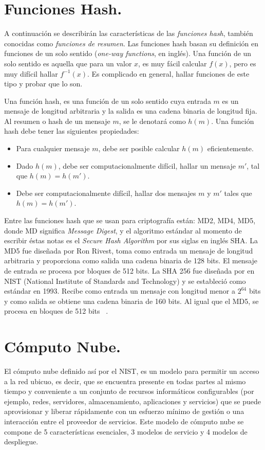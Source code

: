 \section{Funciones Hash. }
A continuación se describirán las características de las {\it funciones hash}, también conocidas como {\it funciones de resumen}. Las funciones hash basan su definición en funciones de un solo sentido  ({\it one-way functions}, en inglés). Una función de un solo sentido es aquella que para un valor $x$, es  muy fácil calcular $f(x)$, pero es muy difícil hallar $f^{-1}(x)$. Es complicado en general, hallar funciones de este tipo y probar que lo son.
\begin{definition}
Una función hash, es una función de un solo sentido cuya entrada $m$  es un mensaje de longitud arbitraria y la salida es una cadena binaria de longitud fija. Al resumen o hash de un mensaje $m$, se le denotará como $h(m)$. Una función hash debe
tener las siguientes propiedades:
\begin{itemize}
	\item Para cualquier mensaje $m$, debe ser posible calcular $h(m)$ eficientemente. 
	\item Dado $h(m)$, debe ser computacionalmente difícil, hallar un mensaje $m'$, tal que $h(m)=h(m')$.
	\item Debe ser computacionalmente difícil, hallar dos mensajes $m$ y $m'$ tales que $h(m)=h(m')$.
\end{itemize}
\end{definition}
 
Entre las funciones hash que se usan para criptograf\'ia est\'an: MD2, MD4, MD5, donde MD significa {\it Message Digest}, y el algoritmo est\'andar al momento de escribir \'estas notas es el {\it Secure Hash Algorithm} por sus siglas en ingl\'es SHA.
  La MD5 fue dise\~nada por Ron Rivest, toma como entrada un mensaje de longitud arbitraria y proporciona como salida una cadena binaria de 128 bits.
El mensaje de entrada se procesa por bloques de 512 bits.  La SHA 256 fue dise\~nada por en NIST (National Institute of Standards and Technology) y se estableci\'o como est\'andar en 1993. Recibe como entrada un mensaje con longitud menor a $2^{64}$ bits y
como salida se obtiene una cadena binaria de 160 bits. Al igual que el MD5, se procesa en bloques de 512 bits ~\cite{modes}.


\section{Cómputo Nube. }
El cómputo nube definido así por el NIST, es un modelo para permitir un acceso a la red ubicuo, es decir, que se encuentra presente en todas partes al mismo tiempo y conveniente a un conjunto de recursos informáticos configurables (por ejemplo, redes, servidores, almacenamiento, aplicaciones y servicios) que se puede aprovisionar y liberar rápidamente con un esfuerzo mínimo de gestión o una interacción entre el proveedor de servicios.
Este modelo de cómputo nube se compone de 5 características esenciales, 3 modelos de servicio y 4  modelos de despliegue. \\ \\  

